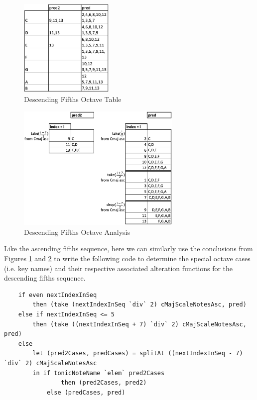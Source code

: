 \documentclass{report}
\begin{document}
\begin{figure}[h!]
\centering
\includegraphics[width=0.4\textwidth]{images/desc_fifths_octave_grid}
  \caption{Descending Fifths Octave Table}
  \label{fig:desc_fifths_octave_grid}
\end{figure}

\begin{figure}[h!]
\centering
\includegraphics[width=0.7\textwidth]{images/desc_fifths_octave_analysis}
  \caption{Descending Fifths Octave Analysis}
  \label{fig:desc_fifths_octave_analysis}
\end{figure}
\newpage
Like the ascending fifths sequence, here we can similarly use the conclusions from Figures \ref{fig:desc_fifths_octave_grid} and \ref{fig:desc_fifths_octave_analysis} to write the following code to determine the special octave cases (i.e. key names) and their respective associated alteration functions for the descending fifths sequence.

\begin{verbatim}
    if even nextIndexInSeq 
        then (take (nextIndexInSeq `div` 2) cMajScaleNotesAsc, pred)
    else if nextIndexInSeq <= 5
        then (take ((nextIndexInSeq + 7) `div` 2) cMajScaleNotesAsc, pred)
    else 
        let (pred2Cases, predCases) = splitAt ((nextIndexInSeq - 7) `div` 2) cMajScaleNotesAsc
        in if tonicNoteName `elem` pred2Cases 
                then (pred2Cases, pred2) 
            else (predCases, pred)
\end{verbatim}
\end{document}
